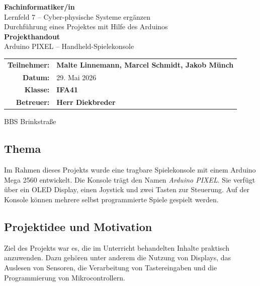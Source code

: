 \documentclass[12pt,a4paper]{article}
\newcommand{\teilnehmer}{{\textbf{Malte Linnemann, Marcel Schmidt, Jakob Münch}}}
\newcommand{\datum}{29. Mai 2026}
\begin{document}
\begin{titlepage}
\vspace*{2cm}
\begin{center}
    {\LARGE \textbf{Fachinformatiker/in}}\\[0.3cm]
    {\Large Lernfeld 7 – Cyber-physische Systeme ergänzen}\\[0.3cm]
    {\large Durchführung eines Projektes mit Hilfe des Arduinos}\\[2cm]

    {\Huge \textbf{Projekthandout}}\\[0.5cm]
    {\Large Arduino PIXEL – Handheld-Spielekonsole}\\[3cm]

    \begin{tabular}{rl}
        \textbf{Teilnehmer:} & \teilnehmer \\[0.3cm]
        \textbf{Datum:}      & \datum \\[0.3cm]
        \textbf{Klasse:}     & {\textbf{IFA41}} \\[0.3cm]
        \textbf{Betreuer:}   & {\textbf{Herr Diekbreder}}
    \end{tabular}

    \vfill
    \small BBS Brinkstraße
\end{center}
\end{titlepage}

\subsection{Thema}

Im Rahmen dieses Projekts wurde eine tragbare Spielekonsole mit einem Arduino Mega 2560 entwickelt. Die Konsole trägt den Namen \textit{Arduino PIXEL}. Sie verfügt über ein OLED Display, einen Joystick und zwei Tasten zur Steuerung. Auf der Konsole können mehrere selbst programmierte Spiele gespielt werden.

\subsection{Projektidee und Motivation}

Ziel des Projekts war es, die im Unterricht behandelten Inhalte praktisch anzuwenden. Dazu gehören unter anderem die Nutzung von Displays, das Auslesen von Sensoren, die Verarbeitung von Tastereingaben und die Programmierung von Mikrocontrollern.
\end{document}
